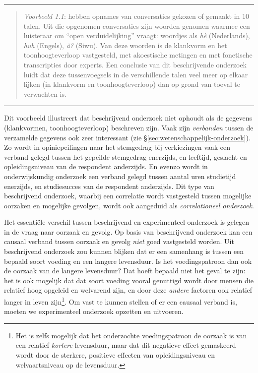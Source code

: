 \documentclass[
]{book}
\begin{document}
\begin{center}\rule{0.5\linewidth}{0.5pt}\end{center}

\begin{quote}
\emph{Voorbeeld 1.1}: \citep{DTE13} hebben opnames van conversaties gekozen of gemaakt in 10 talen. Uit die opgenomen conversaties zijn woorden genomen waarmee een luisteraar om
``open verduidelijking'' vraagt: woordjes als \emph{hè} (Nederlands), \emph{huh}
(Engels), \emph{ã?} (Siwu). Van deze woorden is de klankvorm en het
toonhoogteverloop vastgesteld, met akoestische metingen en met
fonetische transcripties door experts. Een conclusie van dit
beschrijvende onderzoek luidt dat deze tussenvoegsels in de
verschillende talen veel meer op elkaar lijken (in klankvorm en
toonhoogteverloop) dan op grond van toeval te verwachten is.
\end{quote}

\begin{center}\rule{0.5\linewidth}{0.5pt}\end{center}

Dit voorbeeld illustreert dat beschrijvend onderzoek niet ophoudt als de
gegevens (klankvormen, toonhoogteverloop) beschreven zijn. Vaak zijn
\emph{verbanden} tussen de verzamelde gegevens ook zeer interessant (zie §\ref{sec:wetenschappelijk-onderzoek}).
Zo wordt in opiniepeilingen naar het stemgedrag bij verkiezingen vaak
een verband gelegd tussen het gepeilde stemgedrag enerzijds, en
leeftijd, geslacht en opleidingsniveau van de respondent anderzijds. En
evenzo wordt in onderwijskundig onderzoek een verband gelegd tussen
aantal uren studietijd enerzijds, en studiesucces van de respondent
anderzijds. Dit type van beschrijvend onderzoek, waarbij een correlatie
wordt vastgesteld tussen mogelijke oorzaken en mogelijke gevolgen, wordt
ook aangeduid als \emph{correlationeel onderzoek}.

Het essentiële verschil tussen beschrijvend en experimenteel onderzoek
is gelegen in de vraag naar oorzaak en gevolg. Op basis van beschrijvend
onderzoek kan een causaal verband tussen oorzaak en gevolg \emph{niet} goed
vastgesteld worden. Uit beschrijvend onderzoek zou kunnen blijken dat er
een samenhang is tussen een bepaald soort voeding en een langere
levensduur. Is het voedingspatroon dan ook de oorzaak van de langere
levensduur? Dat hoeft bepaald niet het geval te zijn: het is ook
mogelijk dat dat soort voeding vooral genuttigd wordt door mensen die
relatief hoog opgeleid en welvarend zijn, en door deze \emph{andere} factoren
ook relatief langer in leven zijn\footnote{Het is zelfs mogelijk dat het onderzochte voedingspatroon de oorzaak is van een relatief \emph{kortere} levensduur, maar dat dit negatieve effect gemaskeerd wordt door de sterkere, positieve effecten van opleidingsniveau en welvaartsniveau op de levensduur.}. Om vast te kunnen stellen of er
een causaal verband is, moeten we experimenteel onderzoek opzetten en
uitvoeren.
\end{document}
